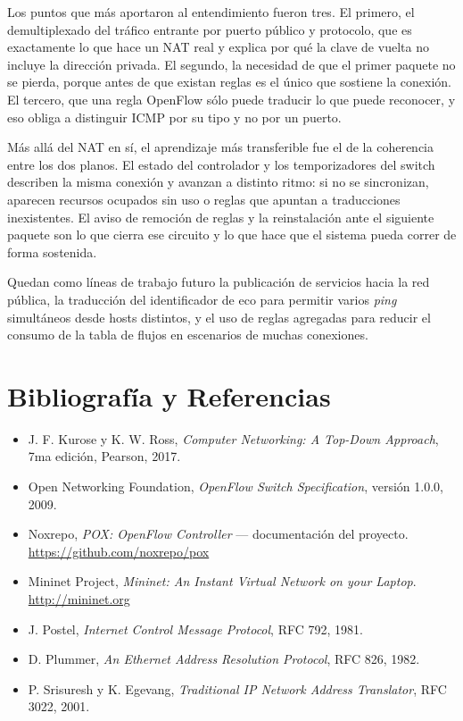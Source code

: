 ﻿\documentclass[10pt,a4paper]{article}
\begin{document}
Los puntos que más aportaron al entendimiento fueron tres. El primero, el
demultiplexado del tráfico entrante por puerto público y protocolo, que es
exactamente lo que hace un NAT real y explica por qué la clave de vuelta no incluye
la dirección privada. El segundo, la necesidad de que el primer paquete no se pierda,
porque antes de que existan reglas es el único que sostiene la conexión. El tercero,
que una regla OpenFlow sólo puede traducir lo que puede reconocer, y eso obliga a
distinguir ICMP por su tipo y no por un puerto.

Más allá del NAT en sí, el aprendizaje más transferible fue el de la coherencia entre
los dos planos. El estado del controlador y los temporizadores del switch describen
la misma conexión y avanzan a distinto ritmo: si no se sincronizan, aparecen recursos
ocupados sin uso o reglas que apuntan a traducciones inexistentes. El aviso de
remoción de reglas y la reinstalación ante el siguiente paquete son lo que cierra ese
circuito y lo que hace que el sistema pueda correr de forma sostenida.

Quedan como líneas de trabajo futuro la publicación de servicios hacia la red
pública, la traducción del identificador de eco para permitir varios \emph{ping}
simultáneos desde hosts distintos, y el uso de reglas agregadas para reducir el
consumo de la tabla de flujos en escenarios de muchas conexiones.

\section{Bibliografía y Referencias}
\begin{itemize}[nosep]
    \item J. F. Kurose y K. W. Ross, \emph{Computer Networking: A Top-Down Approach},
          7ma edición, Pearson, 2017.
    \item Open Networking Foundation, \emph{OpenFlow Switch Specification}, versión
          1.0.0, 2009.
    \item Noxrepo, \emph{POX: OpenFlow Controller} --- documentación del proyecto.
          \url{https://github.com/noxrepo/pox}
    \item Mininet Project, \emph{Mininet: An Instant Virtual Network on your Laptop}.
          \url{http://mininet.org}
    \item J. Postel, \emph{Internet Control Message Protocol}, RFC 792, 1981.
    \item D. Plummer, \emph{An Ethernet Address Resolution Protocol}, RFC 826, 1982.
    \item P. Srisuresh y K. Egevang, \emph{Traditional IP Network Address Translator},
          RFC 3022, 2001.
\end{itemize}
\end{document}

